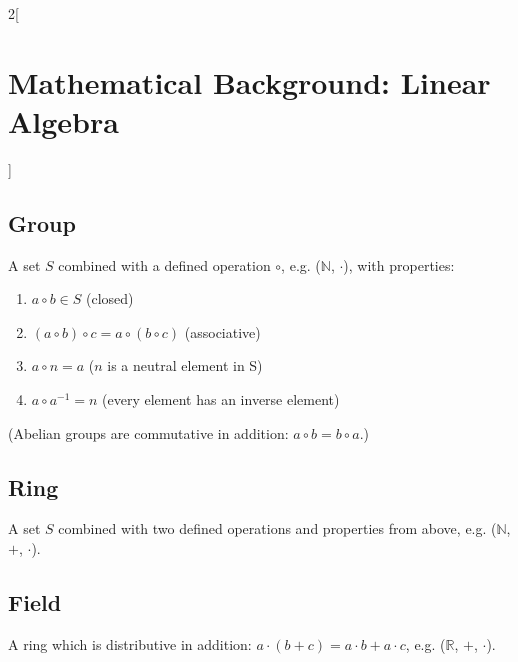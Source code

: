 \documentclass[oneside,fontsize=11pt,paper=a4]{scrartcl}
\begin{document}
\begin{multicols}{2}[\section{Mathematical Background: Linear Algebra}]
\subsection{Group}
A set $S$ combined with a defined operation $\circ$, e.g. ($\mathbb{N}$, $\cdot$), with properties:
\begin{enumerate}
	\item $a \circ b \in S$ (closed)
	\item $(a \circ b) \circ c = a \circ (b \circ c)$ (associative)
	\item $a \circ n = a$ ($n$ is a neutral element in S)
	\item $a \circ a^{-1} = n$ (every element has an inverse element)
\end{enumerate}
(Abelian groups are commutative in addition: $a \circ b = b \circ a$.)

\subsection{Ring}
A set $S$ combined with two defined operations and properties from above, e.g. ($\mathbb{N}$, $+$, $\cdot$).

\subsection{Field}
A ring which is distributive in addition: $a \cdot (b + c) = a \cdot b + a \cdot c$, e.g. ($\mathbb{R}$, $+$, $\cdot$).


\end{multicols}
\end{document}
